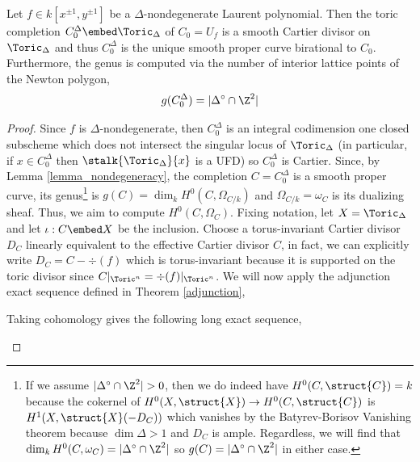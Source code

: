 \begin{thm}[Baker]
Let $f \in k[x^{\pm 1}, y^{\pm 1}]$ be a $\Delta$-nondegenerate Laurent polynomial. Then the toric completion $C_0^\Delta \embed \Toric_\Delta$ of $C_0 = U_f$ is a smooth Cartier divisor on $\Toric_\Delta$ and thus $C_0^\Delta$ is the unique smooth proper curve birational to $C_0$. Furthermore, the genus is computed via the number of interior lattice points of the Newton polygon, 
\[ g(C_0^\Delta) = |\Delta^\circ \cap \Z^2| \]
\end{thm}

\begin{proof}
Since $f$ is $\Delta$-nondegenerate, then $C_0^\Delta$ is an integral codimension one closed subscheme which does not intersect the singular locus of $\Toric_\Delta$ (in particular, if $x \in C_0^\Delta$ then $\stalk{\Toric_\Delta}{x}$ is a UFD) so $C_0^\Delta$ is Cartier. Since, by Lemma \ref{lemma_nondegeneracy}, the completion $C = C_0^\Delta$ is a smooth proper curve, its genus\footnote{If we assume $|\Delta^\circ \cap \Z^2| > 0$, then we do indeed have $H^0(C, \struct{C}) = k$ because the cokernel of $H^0(X, \struct{X}) \to H^0(C, \struct{C})$ is $H^1(X, \struct{X}(-D_C))$ which vanishes by the Batyrev-Borisov Vanishing theorem \cite[Thm. 9.2.7]{cox} because $\dim{\Delta} > 1$ and $D_C$ is ample. Regardless, we will find that $\dim_k H^0(C, \omega_C) = |\Delta^\circ \cap \Z^2|$ so $g(C) = |\Delta^\circ \cap \Z^2|$ in either case.} is $g(C) = \dim_k H^0(C, \Omega_{C/k})$ and $\Omega_{C/k} = \omega_{C}$ is its dualizing sheaf. Thus, we aim to compute $H^0(C, \Omega_C)$. Fixing notation, let $X = \Toric_\Delta$ and let $\iota : C \embed X$ be the inclusion. Choose a torus-invariant Cartier divisor $D_C$ linearly equivalent to the effective Cartier divisor $C$, in fact, we can explicitly write $D_C = C - \div{(f)}$ which is torus-invariant because it is supported on the toric divisor since $C|_{\Toric^n} = \div{(f)}|_{\Toric^n}$. We will now apply the adjunction exact sequence defined in Theorem \ref{adjunction},
\begin{center}
\end{center}
Taking cohomology gives the following long exact sequence,
\begin{center}
\end{center}
\end{proof}
